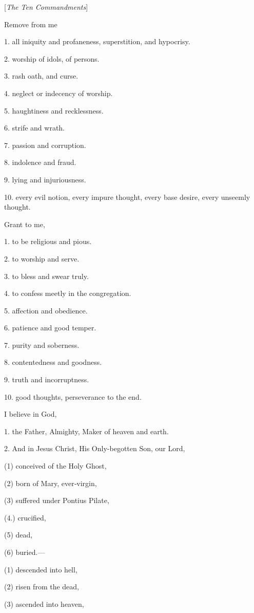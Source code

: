 
[\emph{The Ten Commandments}]

Remove from me

1. all iniquity and profaneness, superstition, and hypocrisy.

2. worship of idols, of persons.

3. rash oath, and curse.

4. neglect or indecency of worship.

5. haughtiness and recklessness.

6. strife and wrath.

7. passion and corruption.

8. indolence and fraud.

9. lying and injuriousness.

10. every evil notion, every impure thought, every base desire, every unseemly thought.

Grant to me,

1. to be religious and pious.

2. to worship and serve.

3. to bless and swear truly.

4. to confess meetly in the congregation.

5. affection and obedience.

6. patience and good temper.

7. purity and soberness.

8. contentedness and goodness.

9. truth and incorruptness.

10. good thoughts, perseverance to the end.


I believe in God,

1. the Father, Almighty, Maker of heaven and earth.

2. And in Jesus Christ, His Only-begotten Son, our Lord,

(1) conceived of the Holy Ghost,

(2) born of Mary, ever‑virgin,

(3) suffered under Pontius Pilate,

(4.) crucified,

(5) dead,

(6) buried.—

(1) descended into hell,

(2) risen from the dead,

(3) ascended into heaven,

